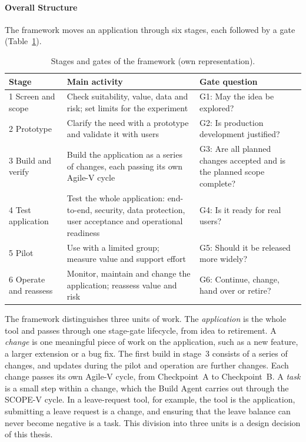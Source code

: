 \documentclass[10pt,a4paper]{article}
\begin{document}
\paragraph{Overall Structure}
\label{sec:stage-gate-structure}

The framework moves an application through six stages, each followed by a gate (Table~\ref{tab:stage-gate-overview}).

\begin{table}[H]
    \centering
    \small
    \caption{Stages and gates of the framework (own representation).}
    \label{tab:stage-gate-overview}
    \begin{tabular}{p{3.0cm} p{6.4cm} p{4.2cm}}
    \hline
    \textbf{Stage} & \textbf{Main activity} & \textbf{Gate question} \\
    \hline
    1 Screen and scope & Check suitability, value, data and risk; set limits for the experiment & G1: May the idea be explored? \\
    2 Prototype & Clarify the need with a prototype and validate it with users & G2: Is production development justified? \\
    3 Build and verify & Build the application as a series of changes, each passing its own Agile-V cycle & G3: Are all planned changes accepted and is the planned scope complete? \\
    4 Test application & Test the whole application: end-to-end, security, data protection, user acceptance and operational readiness & G4: Is it ready for real users? \\
    5 Pilot & Use with a limited group; measure value and support effort & G5: Should it be released more widely? \\
    6 Operate and reassess & Monitor, maintain and change the application; reassess value and risk & G6: Continue, change, hand over or retire? \\
    \hline
    \end{tabular}
\end{table}

The framework distinguishes three units of work. The \emph{application}
is the whole tool and passes through one stage-gate lifecycle, from idea
to retirement. A \emph{change} is one meaningful piece of work on the
application, such as a new feature, a larger extension or a bug fix. The
first build in stage~3 consists of a series of changes, and updates
during the pilot and operation are further changes. Each change passes
its own Agile-V cycle, from Checkpoint~A to Checkpoint~B. A \emph{task}
is a small step within a change, which the Build Agent carries out
through the SCOPE-V cycle. In a leave-request tool, for example, the
tool is the application, submitting a leave request is a change, and
ensuring that the leave balance can never become negative is a task.
This division into three units is a design decision of this thesis.
\end{document}
